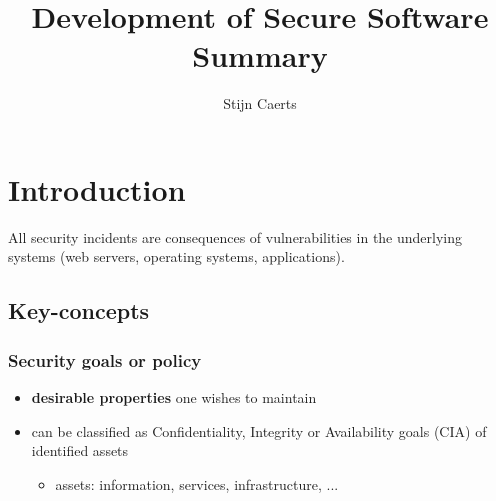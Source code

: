 \documentclass[12pt,titlepage,a4paper]{report}
\author{Stijn Caerts}
\title{Development of Secure Software\\\small{Summary}}
\begin{document}
	\maketitle
	\tableofcontents
	\newpage
	
	\chapter{Introduction}
		All security incidents are consequences of vulnerabilities in the underlying systems (web servers, operating systems, applications).
		
		\section{Key-concepts}
			\subsection{Security goals or policy}
				\begin{itemize}
					\item \textbf{desirable properties} one wishes to maintain
					\item can be classified as Confidentiality, Integrity or Availability goals (CIA) of identified assets
					\begin{itemize}
						\item assets: information, services, infrastructure, ...
					\end{itemize}
				\end{itemize}
\end{document}
